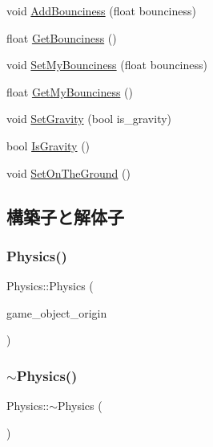 \begin{DoxyCompactItemize}
\item 
void \mbox{\hyperlink{class_physics_af88191e5605a97952caefd19319b05f9}{Add\+Bounciness}} (float bounciness)
\item 
float \mbox{\hyperlink{class_physics_a5126745b31c45267ae516cc09a82fb5d}{Get\+Bounciness}} ()
\item 
void \mbox{\hyperlink{class_physics_a662185709961c64615c51ac5f32ab2ff}{Set\+My\+Bounciness}} (float bounciness)
\item 
float \mbox{\hyperlink{class_physics_acd6312afafb3faed57ba6450ed9ab9a6}{Get\+My\+Bounciness}} ()
\item 
void \mbox{\hyperlink{class_physics_a6f4c3f73eb1d2669ccc449b0d74f9d32}{Set\+Gravity}} (bool is\+\_\+gravity)
\item 
bool \mbox{\hyperlink{class_physics_a666e85a519fcb5f350a1f42273842f4d}{Is\+Gravity}} ()
\item 
void \mbox{\hyperlink{class_physics_a4e132f82ecc7f24200ec72213e2dc0c6}{Set\+On\+The\+Ground}} ()
\end{DoxyCompactItemize}


\subsection{構築子と解体子}
\mbox{\label{class_physics_af419194525721fccefec3ffde8fd8848}} 
\subsubsection{\texorpdfstring{Physics()}{Physics()}}
{\footnotesize\ttfamily Physics\+::\+Physics (\begin{DoxyParamCaption}\item[{\mbox{\hyperlink{class_game_object_origin}{Game\+Object\+Origin}} $\ast$}]{game\+\_\+object\+\_\+origin }\end{DoxyParamCaption})}

\mbox{\label{class_physics_a045c3788e28059d3920136499942490f}} 
\subsubsection{\texorpdfstring{$\sim$\+Physics()}{~Physics()}}
{\footnotesize\ttfamily Physics\+::$\sim$\+Physics (\begin{DoxyParamCaption}{ }\end{DoxyParamCaption})}



